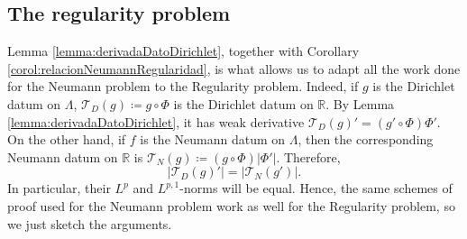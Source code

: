 \documentclass[12pt]{amsart}
\newcommand{\R}{\mathbb{R}}
\theoremstyle{plain}
\theoremstyle{definition}
\numberwithin{equation}{section}
\begin{document}
\subsection{The regularity problem}

Lemma \ref{lemma:derivadaDatoDirichlet}, together with Corollary \ref{corol:relacionNeumannRegularidad}, is what allows us to adapt all the work done for the Neumann problem to the Regularity problem. Indeed, if $g$ is the Dirichlet datum on $\Lambda$, $\mathcal{T}_{D}(g)\coloneqq g\circ\Phi$ is the Dirichlet datum on $\R$. By Lemma \ref{lemma:derivadaDatoDirichlet}, it has weak derivative $\mathcal{T}_{D}(g)'=(g'\circ\Phi)\Phi'$. On the other hand, if $f$ is the Neumann datum on $\Lambda$, then the corresponding Neumann datum on $\R$ is $\mathcal{T}_{N}(g)\coloneqq (g\circ\Phi)|\Phi'|$. Therefore,
\begin{equation}\label{eq:relationNeumannDirichletData}
|\mathcal{T}_{D}(g)'|
=
|\mathcal{T}_{N}(g')|.    
\end{equation}
In particular, their $L^p$ and $L^{p,1}$-norms will be equal. Hence, the same schemes of proof used for the Neumann problem work as well for the Regularity problem, so we just sketch the arguments.
\end{document}
